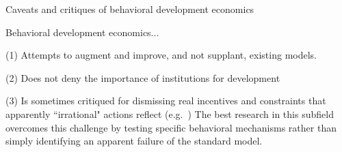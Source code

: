 \documentclass[aspectratio=169, 10pt, handout]{beamer}
\newenvironment{wideitemize}{\itemize\addtolength{\itemsep}{10pt}}{\enditemize}
\begin{document}
\begin{frame}{Caveats and critiques of behavioral development economics}

\noindent Behavioral development economics...

\bigskip

\begin{wideitemize}

	\item[(1)] Attempts to augment and improve, and not supplant, existing models. 
	
	\item[(2)] Does not deny the importance of institutions for development 
	
	\item[(3)] Is sometimes critiqued for dismissing real incentives and constraints that apparently ``irrational" actions reflect (e.g.\ \cite{rosenzweig2014rainfall})
	The best research in this subfield overcomes this challenge by testing specific behavioral mechanisms rather than simply identifying an apparent failure of the standard model.

	
\end{wideitemize}


\end{frame}
\end{document}
